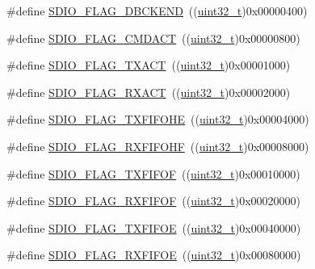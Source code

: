 \begin{DoxyCompactItemize}
\item 
\#define \hyperlink{group___s_d_i_o___flags_ga5452d8033567821709bd7d5f06547b70}{S\+D\+I\+O\+\_\+\+F\+L\+A\+G\+\_\+\+D\+B\+C\+K\+E\+ND}~((\hyperlink{_p_e___types_8h_a33594304e786b158f3fb30289278f5af}{uint32\+\_\+t})0x00000400)
\item 
\#define \hyperlink{group___s_d_i_o___flags_gad12a9b2bd30e7b907cbabfd92fc645b3}{S\+D\+I\+O\+\_\+\+F\+L\+A\+G\+\_\+\+C\+M\+D\+A\+CT}~((\hyperlink{_p_e___types_8h_a33594304e786b158f3fb30289278f5af}{uint32\+\_\+t})0x00000800)
\item 
\#define \hyperlink{group___s_d_i_o___flags_gad5d075c98012586b169ec131aab2eeb5}{S\+D\+I\+O\+\_\+\+F\+L\+A\+G\+\_\+\+T\+X\+A\+CT}~((\hyperlink{_p_e___types_8h_a33594304e786b158f3fb30289278f5af}{uint32\+\_\+t})0x00001000)
\item 
\#define \hyperlink{group___s_d_i_o___flags_gacc935dd830338970890a05922dff8ab7}{S\+D\+I\+O\+\_\+\+F\+L\+A\+G\+\_\+\+R\+X\+A\+CT}~((\hyperlink{_p_e___types_8h_a33594304e786b158f3fb30289278f5af}{uint32\+\_\+t})0x00002000)
\item 
\#define \hyperlink{group___s_d_i_o___flags_gae9277461d3c8984dc31af318e2df1959}{S\+D\+I\+O\+\_\+\+F\+L\+A\+G\+\_\+\+T\+X\+F\+I\+F\+O\+HE}~((\hyperlink{_p_e___types_8h_a33594304e786b158f3fb30289278f5af}{uint32\+\_\+t})0x00004000)
\item 
\#define \hyperlink{group___s_d_i_o___flags_ga8c5942ae3df21efad2d7c61a46015758}{S\+D\+I\+O\+\_\+\+F\+L\+A\+G\+\_\+\+R\+X\+F\+I\+F\+O\+HF}~((\hyperlink{_p_e___types_8h_a33594304e786b158f3fb30289278f5af}{uint32\+\_\+t})0x00008000)
\item 
\#define \hyperlink{group___s_d_i_o___flags_gad3ca936300ef251639a4cfbe2f63b6b8}{S\+D\+I\+O\+\_\+\+F\+L\+A\+G\+\_\+\+T\+X\+F\+I\+F\+OF}~((\hyperlink{_p_e___types_8h_a33594304e786b158f3fb30289278f5af}{uint32\+\_\+t})0x00010000)
\item 
\#define \hyperlink{group___s_d_i_o___flags_gaf92cb783f000b8d946fe8ace81b51df2}{S\+D\+I\+O\+\_\+\+F\+L\+A\+G\+\_\+\+R\+X\+F\+I\+F\+OF}~((\hyperlink{_p_e___types_8h_a33594304e786b158f3fb30289278f5af}{uint32\+\_\+t})0x00020000)
\item 
\#define \hyperlink{group___s_d_i_o___flags_gac41ef05773abad79b4b0c443a77733db}{S\+D\+I\+O\+\_\+\+F\+L\+A\+G\+\_\+\+T\+X\+F\+I\+F\+OE}~((\hyperlink{_p_e___types_8h_a33594304e786b158f3fb30289278f5af}{uint32\+\_\+t})0x00040000)
\item 
\#define \hyperlink{group___s_d_i_o___flags_ga59ea7e2dc22df742053c5e525b98599d}{S\+D\+I\+O\+\_\+\+F\+L\+A\+G\+\_\+\+R\+X\+F\+I\+F\+OE}~((\hyperlink{_p_e___types_8h_a33594304e786b158f3fb30289278f5af}{uint32\+\_\+t})0x00080000)

\end{DoxyCompactItemize}
